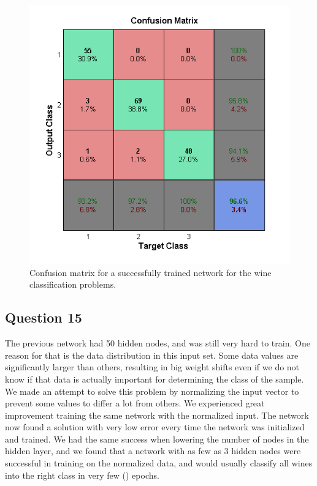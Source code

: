 \documentclass[a4paper]{article}
\begin{document}
\begin{figure}[h!] %
    \includegraphics[]{wine_classification.png}
    \caption{\label{fig:wine_classification}Confusion matrix for a successfully trained network for the wine classification problems.}
\end{figure}

\subsection*{Question 15}
The previous network had 50 hidden nodes, and was still very hard to train. One reason 
for that is the data distribution in this input set. 
Some data values are significantly larger than others, resulting in big weight shifts 
even if we do not know if that data is actually important for determining the class of the 
sample. We made an attempt to solve this problem by normalizing the input vector to prevent 
some values to differ a lot from others. 
We experienced great improvement training the same network with the normalized input. The 
network now found a solution with very low error every time the network was initialized 
and trained. We had the same success when lowering the number of nodes in the hidden layer, 
and we found that a network with as few as 3 hidden nodes were successful in training on the 
normalized data, and would usually classify all wines into the right class in very 
few () epochs.
\end{document}
